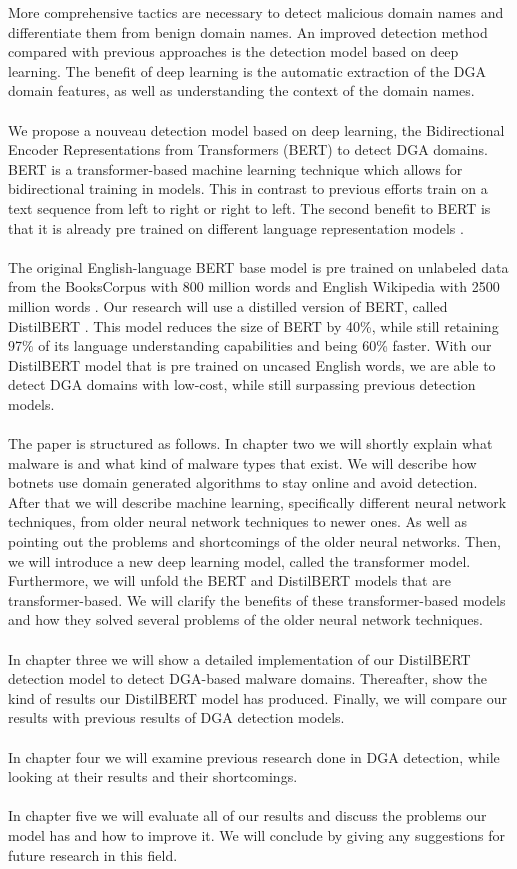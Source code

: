 More comprehensive tactics are necessary to detect malicious domain names and differentiate them from benign domain names. An improved detection method compared with previous approaches is the detection model based on deep learning. The benefit of deep learning is the automatic extraction of the DGA domain features, as well as understanding the context of the domain names.\\\\ We propose a nouveau detection model based on deep learning, the Bidirectional Encoder Representations from Transformers (BERT) to detect DGA domains. BERT is a transformer-based machine learning technique which allows for bidirectional training in models. This in contrast to previous efforts train on a text sequence from left to right or right to left. The second benefit to BERT is that it is already pre trained on different language representation models \cite{DBLP:journals/corr/abs-1810-04805}. \\\\ 
The original English-language BERT base model is pre trained on unlabeled data from the BooksCorpus \cite{BooksCorpus} with 800 million words and English Wikipedia with 2500 million words \cite{ColBERT}. Our research will use a distilled version of BERT, called DistilBERT \cite{Sanh2019DistilBERTAD}. This model reduces the size of BERT by 40\%, while still retaining 97\% of its language understanding capabilities and being 60\% faster. With our DistilBERT model that is pre trained on uncased English words, we are able to detect DGA domains with low-cost, while still surpassing previous detection models.
\pagebreak
\\\\
The paper is structured as follows. In chapter two we will shortly explain what malware is and what kind of malware types that exist. We will describe how botnets use domain generated algorithms to stay online and avoid detection. After that we will describe machine learning, specifically different neural network techniques, from older neural network techniques to newer ones. As well as pointing out the problems and shortcomings of the older neural networks. Then, we will introduce a new deep learning model, called the transformer model. Furthermore, we will unfold the BERT and DistilBERT models that are transformer-based. We will clarify the benefits of these transformer-based models and how they solved several problems of the older neural network techniques. \\\\
In chapter three we will show a detailed implementation of our DistilBERT detection model to detect DGA-based malware domains. Thereafter, show the kind of results our DistilBERT model has produced. Finally, we will compare our results with previous results of DGA detection models.\\\\
In chapter four we will examine previous research done in DGA detection, while looking at their results and their shortcomings.\\\\
In chapter five we will evaluate all of our results and discuss the problems our model has and how to improve it. We will conclude by giving any suggestions for future research in this field.